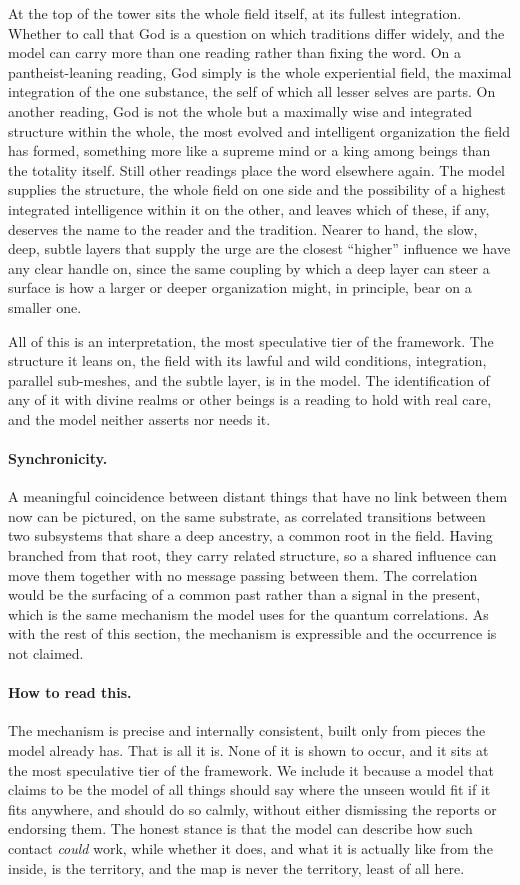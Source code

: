 At the top of the tower sits the whole field itself, at its fullest integration. Whether to call
that God is a question on which traditions differ widely, and the model can carry more than one
reading rather than fixing the word. On a pantheist-leaning reading, God simply is the whole
experiential field, the maximal integration of the one substance, the self of which all lesser
selves are parts. On another reading, God is not the whole but a maximally wise and integrated
structure within the whole, the most evolved and intelligent organization the field has formed,
something more like a supreme mind or a king among beings than the totality itself. Still other
readings place the word elsewhere again. The model supplies the structure, the whole field on one
side and the possibility of a highest integrated intelligence within it on the other, and leaves
which of these, if any, deserves the name to the reader and the tradition. Nearer to hand, the
slow, deep, subtle layers that supply the urge are the
closest ``higher'' influence we have any clear handle on, since the same coupling by which a
deep layer can steer a surface is how a larger or deeper organization might, in principle, bear
on a smaller one.

All of this is an interpretation, the most speculative tier of the framework.
The structure it leans on, the field with its lawful and wild conditions, integration, parallel
sub-meshes, and the subtle layer, is in the model. The identification of any of it with divine
realms or other beings is a reading to hold with real care, and the model neither asserts nor
needs it.

\paragraph{Synchronicity.}
A meaningful coincidence between distant things that have no link between them now can be
pictured, on the same substrate, as correlated transitions between two subsystems that share a
deep ancestry, a common root in the field. Having branched from that root, they carry related
structure, so a shared influence can move them together with no message passing between them.
The correlation would be the surfacing of a common past rather than a signal in the present,
which is the same mechanism the model uses for the quantum correlations. As with the rest of
this section, the mechanism is expressible and the occurrence is not claimed.

\paragraph{How to read this.}
The mechanism is precise and internally consistent, built only from pieces the model already
has. That is all it is. None of it is shown to occur, and it sits at the most speculative tier of
the framework. We include it because a model that claims to be the model of all things should say
where the unseen would fit if it fits anywhere, and should do so calmly, without either dismissing
the reports or endorsing them. The honest stance is that the model can describe how such contact
\emph{could} work, while whether it does, and what it is actually like from the inside, is the
territory, and the map is never the territory, least of all here.
